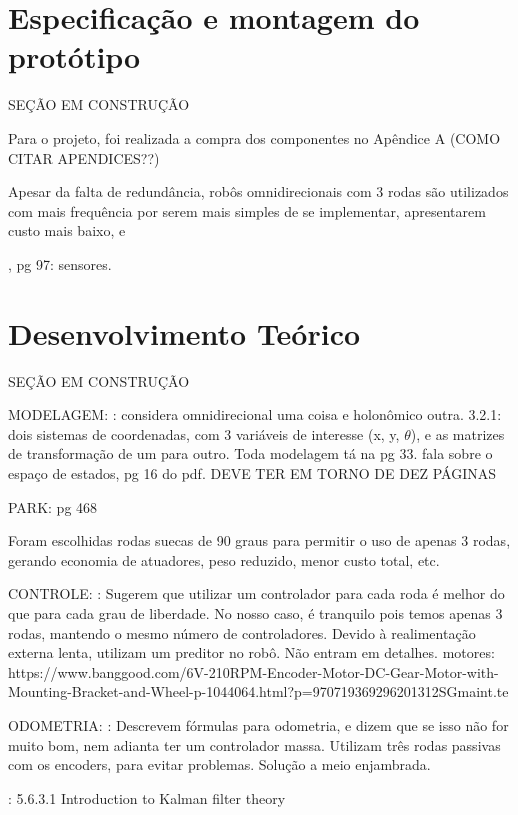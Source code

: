 \section{Especificação e montagem do protótipo}
\label{sec:montagem}

SEÇÃO EM CONSTRUÇÃO

Para o projeto, foi realizada a compra dos componentes no Apêndice A (COMO CITAR APENDICES??)

Apesar da falta de redundância, robôs omnidirecionais com 3 rodas são utilizados com mais frequência por serem mais simples de se implementar, apresentarem custo mais baixo, e

\cite{siegwart2011introduction}, pg 97: sensores.

\section{Desenvolvimento Teórico}
\label{sec:teorico}

SEÇÃO EM CONSTRUÇÃO

MODELAGEM: \cite{siegwart2011introduction}: considera omnidirecional uma coisa e holonômico outra. 3.2.1: dois sistemas de coordenadas, com 3 variáveis de interesse (x, y, $\theta$), e as matrizes de transformação de um para outro. Toda modelagem tá na pg 33.
\cite{spong2005robot} fala sobre o espaço de estados, pg 16 do pdf.
DEVE TER EM TORNO DE DEZ PÁGINAS

PARK: pg 468

Foram escolhidas rodas suecas de 90 graus para permitir o uso de apenas 3 rodas, gerando economia de atuadores, peso reduzido, menor custo total, etc.

 CONTROLE:
 \cite{rojas2006holonomic}: Sugerem que utilizar um controlador para cada roda é melhor do que para cada grau de liberdade. No nosso caso, é tranquilo pois temos apenas 3 rodas, mantendo o mesmo número de controladores. Devido à realimentação externa lenta, utilizam um preditor no robô. Não entram em detalhes.
motores:
https://www.banggood.com/6V-210RPM-Encoder-Motor-DC-Gear-Motor-with-Mounting-Bracket-and-Wheel-p-1044064.html?p=970719369296201312SGmaint.te

ODOMETRIA:
\cite{samani2007comprehensive}: Descrevem fórmulas para odometria, e dizem que se isso não for muito bom, nem adianta ter um controlador massa. Utilizam três rodas passivas com os encoders, para evitar problemas. Solução a meio enjambrada.

\cite{siegwart2011introduction}: 5.6.3.1 Introduction to Kalman filter theory

